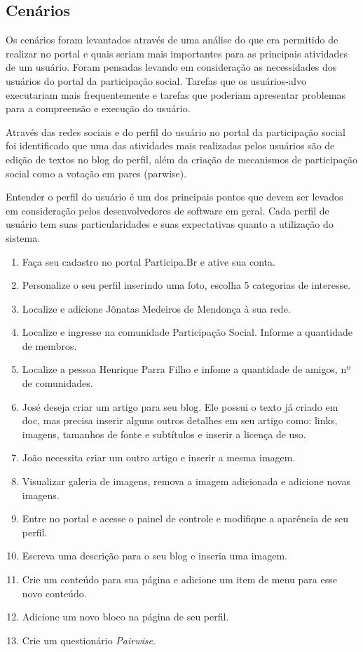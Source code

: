 \subsection{Cenários}

	Os cenários foram levantados através de uma análise do que era permitido de realizar no portal e quais seriam mais importantes para as principais atividades de um usuário. Foram pensadas levando em consideração as necessidades dos usuários do portal da participação social. Tarefas que os usuários-alvo executariam mais frequentemente e tarefas que poderiam apresentar problemas para a compreensão e execução do usuário. 

	Através das redes sociais e do perfil do usuário no portal da participação social foi identificado que uma das atividades mais realizadas pelos usuários são de edição de textos no blog do perfil, além da criação de mecanismos de participação social como a votação em pares (parwise).
	
	Entender o perfil do usuário é um dos principais pontos que devem ser levados em consideração pelos desenvolvedores de software em geral. Cada perfil de usuário tem suas particularidades e suas expectativas quanto a utilização do sistema.

\begin{enumerate}
	\item Faça seu cadastro no portal Participa.Br e ative sua conta.
	\item Personalize o seu perfil inserindo uma foto, escolha 5 categorias de interesse.
	\item Localize e adicione Jônatas Medeiros de Mendonça à sua rede.
	\item Localize e ingresse na comunidade Participação Social. Informe a quantidade de membros.
	\item Localize a pessoa Henrique Parra Filho e infome a quantidade de amigos, nº de comunidades.
	\item José deseja criar um artigo para seu blog. Ele possui o texto já criado em doc, mas precisa inserir alguns outros detalhes em seu artigo como: links, imagens, tamanhos de fonte e subtítulos e inserir a licença de uso.
	\item João necessita criar um outro artigo e inserir a mesma imagem.
	\item Visualizar galeria de imagens, remova a imagem adicionada e adicione novas imagens.
	\item Entre no portal e acesse o painel de controle e modifique a aparência de seu perfil.
	\item Escreva uma descrição para o seu blog e inseria uma imagem.
	\item Crie um conteúdo para sua página e adicione um item de menu para esse novo conteúdo.
	\item Adicione um novo bloco na página de seu perfil.
	\item Crie um questionário \textit{Pairwise}.
\end{enumerate}


